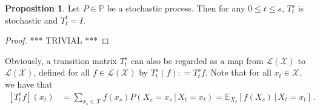 \documentclass[10pt]{paper}
\theoremstyle{definition}
\newtheorem{proposition}[theorem]{Proposition}
\newtheorem{lemma}[theorem]{Lemma}
\newcommand{\reals}{\mathbb{R}}
\newcommand{\realsnonneg}{\reals_{\geq 0}}
\newcommand{\states}{\mathcal{X}}
\newcommand{\processes}{\mathbb{P}}
\newcommand{\mprocesses}{\processes^{\mathrm{M}}}
\newcommand{\gambles}{\mathcal{L}}
\newcommand{\gamblesX}{\gambles(\states)}
\newcommand{\coloneqq}{:\!=}
\begin{document}
\begin{proposition}\label{prop:stochasticprocess:simpleproperties}
Let $P\in\processes$ be a stochastic process. Then for any $0\leq t\leq s$, $T_t^s$ is stochastic and $T_t^t=I$.
\end{proposition}
\begin{proof}
*** TRIVIAL ***
\end{proof}

Obviously, a transition matrix $T_t^s$ can also be regarded as a map from $\gamblesX$ to $\gamblesX$, defined for all $f\in\gamblesX$ by $T_t^s(f)\coloneqq T_t^sf$. Note that for all $x_t\in\states$, we have that
\begin{align*}
\left[T_t^sf\right](x_t) &= \sum_{x_s\in\states}f(x_s)P(X_s=x_s\,\vert\,X_t=x_t)
= \mathbb{E}_{X_s}\left[f(X_s)\,\vert\,X_t=x_t\right]\,.
\end{align*}




\end{document}
